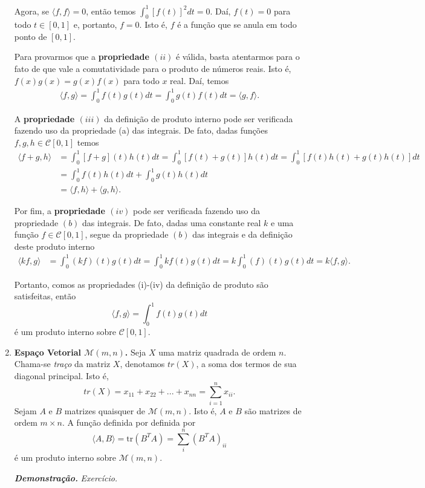 \begin{enumerate}
Agora, se  $\langle f, f \rangle =0$, então temos  $\displaystyle \int_{0}^{1}[f(t)]^2dt=0$. Daí,  $f(t)=0$ para todo $t \in [0,1]$  e, portanto, $f=0$. Isto é, $f$ é a função que se anula em todo ponto de $[0,1]$.

Para provarmos que a \textbf{propriedade $(ii)$ } é válida, basta atentarmos para o fato de que vale a comutatividade para o produto de números reais. Isto é, $f(x)g(x)=g(x)f(x)$ para todo $x$ real. Daí, temos
\begin{align*}
\langle f, g\rangle= \int_{0}^{1}f(t)g(t)dt=\int_{0}^{1}g(t)f(t)dt=\langle g,f\rangle.
\end{align*}

A \textbf{propriedade $(iii)$ } da definição de produto interno pode ser verificada fazendo uso da propriedade (a) das integrais. De fato, dadas funções $f, g, h \in \mathcal{C}[0,1]$ temos
\begin{align*}
\langle f+g, h \rangle& = \int_{0}^{1}[f+g](t)h(t)dt=\int_{0}^{1}[f(t)+g(t)]h(t)dt=\int_{0}^{1}[f(t)h(t)+g(t)h(t)]dt\\
                                   &=\int_{0}^{1}f(t)h(t)dt + \int_{0}^{1}g(t)h(t)dt\\
                                   &=\langle f, h \rangle +\langle g,h \rangle.
\end{align*}

Por fim, a \textbf{propriedade $(iv)$ } pode ser verificada fazendo uso da propriedade $(b)$ das integrais. De fato, dadas uma constante real $k$ e uma  função $f \in \mathcal{C}[0,1]$, segue da propriedade $(b)$ das integrais  e da definição deste produto interno
\begin{align*}
\langle kf, g \rangle& = \int_{0}^{1}(kf)(t)g(t)dt=\int_{0}^{1}kf(t)g(t)dt=k\int_{0}^{1}(f)(t)g(t)dt=k\langle f, g \rangle.
\end{align*}

Portanto, comos as propriedades (i)-(iv) da definição de produto são satisfeitas, então  $$\langle f, g \rangle = \int_{0}^{1}f(t)g(t)dt $$ é um produto interno sobre  $\mathcal{C}[0,1]$.

\item  \textbf{Espaço Vetorial $\mathcal{M}(m,n)$. }   Seja $X$ uma matriz quadrada de ordem $n$. Chama-se  \textit{traço} da matriz $X$, denotamos $tr(X)$,  a soma dos termos de sua diagonal principal. Isto é, $$tr(X)=x_{11}+x_{22}+...+x_{nn}=\sum_{i=1}^{n}{x_{ii}}.$$ Sejam $A$ e $B$ matrizes quaisquer de  $\mathcal{M}(m,n)$. Isto é, $A$ e $B$ são matrizes de ordem $m \times n$. A função  definida por definida por
 $$\langle A, B \rangle = \text{tr}(B^TA)=\sum_{i}^{n}(B^TA)_{ii} $$ é um produto interno sobre $\mathcal{M}(m,n)$.

\textbf{\textit{Demonstração.}} \textit{Exercício.}
\end{enumerate}


